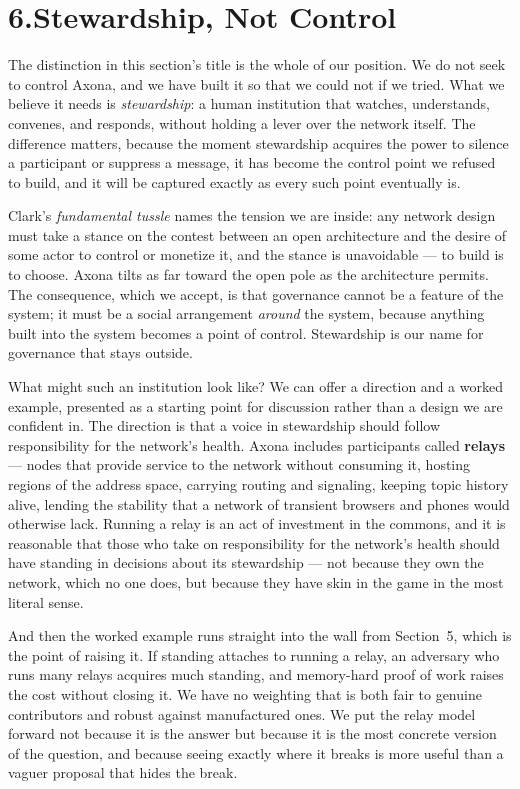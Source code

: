 \documentclass[nobib,justified]{tufte-handout}
\begin{document}
\section{6.\quad Stewardship, Not Control}

The distinction in this section's title is the whole of our position. We do not
seek to control Axona, and we have built it so that we could not if we tried.
What we believe it needs is \emph{stewardship}: a human institution that watches,
understands, convenes, and responds, without holding a lever over the network
itself. The difference matters, because the moment stewardship acquires the power
to silence a participant or suppress a message, it has become the control point we
refused to build, and it will be captured exactly as every such point eventually
is.

Clark's \emph{fundamental tussle} names the tension we are inside: any network
design must take a stance on the contest between an open architecture and the
desire of some actor to control or monetize it, and the stance is unavoidable ---
to build is to choose. Axona tilts as far toward the open pole as the architecture
permits. The consequence, which we accept, is that governance cannot be a feature
of the system; it must be a social arrangement \emph{around} the system, because
anything built into the system becomes a point of control. Stewardship is our name
for governance that stays outside.

What might such an institution look like? We can offer a direction and a worked
example, presented as a starting point for discussion rather than a design we are
confident in. The direction is that a voice in stewardship should follow
responsibility for the network's health. Axona includes participants called
\textbf{relays} --- nodes that provide service to the network without consuming
it, hosting regions of the address space, carrying routing and signaling, keeping
topic history alive, lending the stability that a network of transient browsers
and phones would otherwise lack. Running a relay is an act of investment in the
commons, and it is reasonable that those who take on responsibility for the
network's health should have standing in decisions about its stewardship --- not
because they own the network, which no one does, but because they have skin in the
game in the most literal sense.

And then the worked example runs straight into the wall from Section~5, which is
the point of raising it. If standing attaches to running a relay, an adversary who
runs many relays acquires much standing, and memory-hard proof of work raises the
cost without closing it. We have no weighting that is both fair to genuine
contributors and robust against manufactured ones. We put the relay model forward
not because it is the answer but because it is the most concrete version of the
question, and because seeing exactly where it breaks is more useful than a vaguer
proposal that hides the break.
\end{document}

